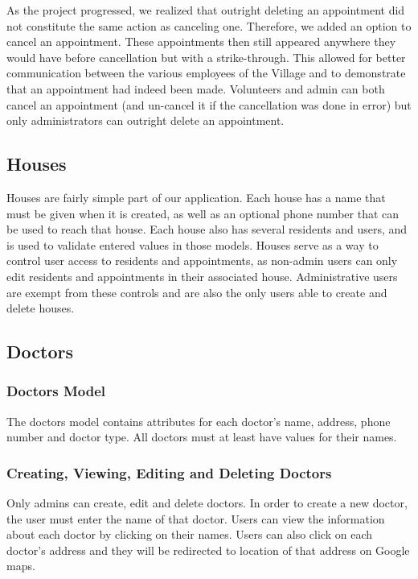 \documentclass{sig-alternate}
\begin{document}
As the project progressed, we realized that outright deleting an appointment did not constitute the same action as canceling one.  Therefore, we added an option to cancel an appointment.  These appointments then still appeared anywhere they would have before cancellation but with a strike-through.  This allowed for better communication between the various employees of the Village and to demonstrate that an appointment had indeed been made.  Volunteers and admin can both cancel an appointment (and un-cancel it if the cancellation was done in error) but only administrators can outright delete an appointment.      

\subsection{Houses}
Houses are fairly simple part of our application. Each house has a name that must be given when it is created, as well as an optional phone number that can be used to reach that house. Each house also has several residents and users, and is used to validate entered values in those models. Houses serve as a way to control user access to residents and appointments, as non-admin users can only edit residents and appointments in their associated house. Administrative users are exempt from these controls and are also the only users able to create and delete houses.

\subsection{Doctors}

\subsubsection{Doctors Model}
The doctors model contains attributes for each doctor’s name, address, phone number and doctor type. All doctors must at least have values for their names. 

\subsubsection{Creating, Viewing, Editing and Deleting Doctors}
Only admins can create, edit and delete doctors. In order to create a new doctor, the user must enter the name of that doctor. Users can view the information about each doctor by clicking on their names. Users can also click on each doctor’s address and they will be redirected to location of that address on Google maps. 
\end{document}
